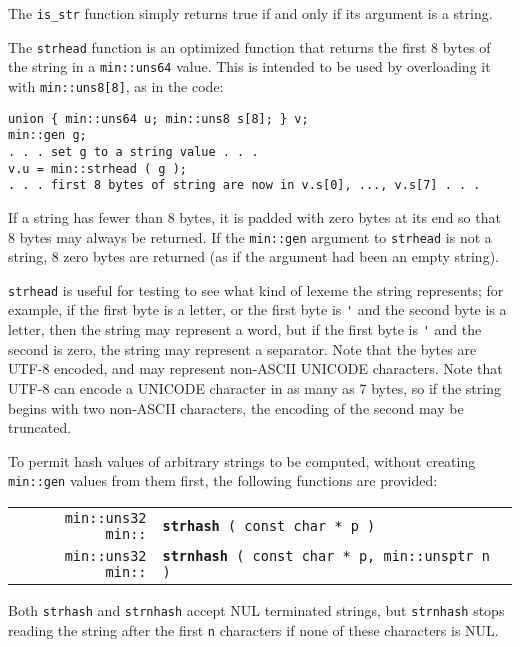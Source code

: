 \documentclass[12pt]{article}
\makeatletter
\newcommand{\ttindex}[1]{\index{#1@{\tt #1}}}
\newcommand{\minindex}[1]{\ttindex{min::#1}\ttindex{#1}}
\newenvironment{indpar}[1][0.3in]%
	{\begin{list}{}%
		     {\setlength{\itemsep}{0in}%
		      \setlength{\topsep}{0in}%
		      \setlength{\parsep}{1ex}%
		      \setlength{\labelwidth}{#1}%
		      \setlength{\leftmargin}{#1}%
		      \addtolength{\leftmargin}{\labelsep}}%
	 \item}%
	{\end{list}}
\newcommand{\LABEL}[1]{\label{#1}}
\newcommand{\MINKEY}[1]{{\tt \bf #1}\minindex{#1}}
\makeatother
\begin{document}
The \verb|is_str| function simply returns true if and only if
its argument is a string.

The \verb|strhead| function is an optimized function that
returns the first 8 bytes of the string
in a \verb|min::uns64| value.  This is intended to be used by
overloading it with \verb|min::uns8[8]|, as in the code:

\begin{indpar}\begin{verbatim}
union { min::uns64 u; min::uns8 s[8]; } v;
min::gen g;
. . . set g to a string value . . .
v.u = min::strhead ( g );
. . . first 8 bytes of string are now in v.s[0], ..., v.s[7] . . .
\end{verbatim}\end{indpar}

If a string has fewer than 8 bytes, it is padded with zero bytes
at its end so that 8 bytes may always be returned.  If the \verb|min::gen|
argument to \verb|strhead| is not a string, 8 zero bytes are returned
(as if the argument had been an empty string).

\verb|strhead| is useful for testing
to see what kind of lexeme the string represents; for
example, if the first byte is a letter, or the first byte is \verb|'|
and the second byte is a letter, then the string may represent a
word, but if the first byte is \verb|'| and the second is zero,
the string may represent a separator.
Note that the bytes are UTF-8 encoded, and may represent non-ASCII
UNICODE characters.  Note that UTF-8 can encode a UNICODE character
in as many as 7 bytes, so if the string begins with two non-ASCII
characters, the encoding of the second may be truncated.

To permit hash values of arbitrary strings to be computed,
without creating {\tt min::gen} values from them first,
the following functions are provided:

\begin{indpar}\begin{tabular}{r@{}l}
\verb|min::uns32 min::| & \MINKEY{strhash}\verb| ( const char * p )|
\LABEL{MIN::STRHASH} \\
\verb|min::uns32 min::|
    & \MINKEY{strnhash}\verb| ( const char * p, min::unsptr n )|
\LABEL{MIN::STRNHASH} \\
\end{tabular}\end{indpar}

Both \verb|strhash| and \verb|strnhash| accept NUL terminated strings, but
\verb|strnhash| stops reading the string after the first \verb|n| characters
if none of these characters is NUL.
\end{document}
